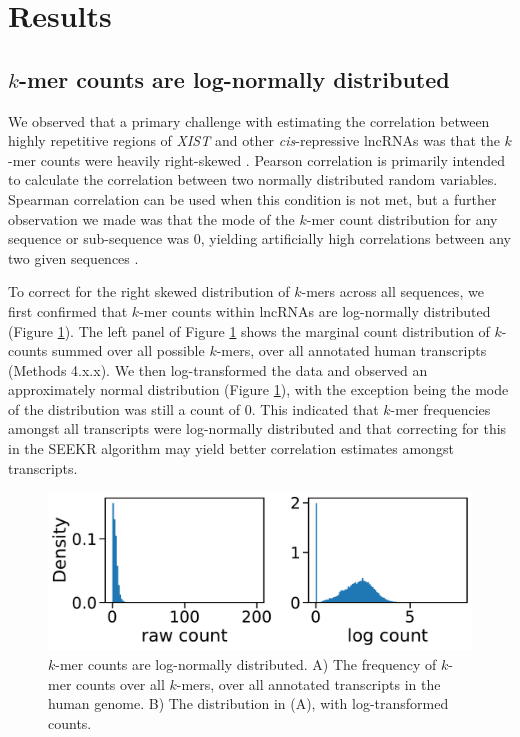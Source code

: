\section{Results} 

\subsection{$k$-mer counts are log-normally distributed}

We observed that a primary challenge with estimating the correlation between highly repetitive regions of \emph{XIST} and other \emph{cis}-repressive lncRNAs was that the $k$-mer counts were heavily right-skewed \cite{Sprague2019NonlinearDomains}. Pearson correlation is primarily intended to calculate the correlation between two normally distributed random variables. Spearman correlation can be used when this condition is not met, but a further observation we made was that the mode of the $k$-mer count distribution for any sequence or sub-sequence was 0, yielding artificially high correlations between any two given sequences \cite{Sprague2019NonlinearDomains}. 

To correct for the right skewed distribution of $k$-mers across all sequences, we first confirmed that $k$-mer counts within lncRNAs are log-normally distributed (Figure \ref{fig:logdist}). The left panel of Figure \ref{fig:logdist} shows the marginal count distribution of $k$-counts summed over all possible $k$-mers, over all annotated human transcripts (Methods 4.x.x). We then log-transformed the data and observed an approximately normal distribution (Figure \ref{fig:logdist}), with the exception being the mode of the distribution was still a count of 0. This indicated that $k$-mer frequencies amongst all transcripts were log-normally distributed and that correcting for this in the SEEKR algorithm may yield better correlation estimates amongst transcripts. 
\begin{figure}[h!]
\centering
\includegraphics[width=\textwidth]{images/kmers_log_dist.pdf}
\caption[$k$-mers are log-normally distributed within sequences]{$k$-mer counts are log-normally distributed. A) The frequency of $k$-mer counts over all $k$-mers, over all annotated transcripts in the human genome. B) The distribution in (A), with log-transformed counts.}
\label{fig:logdist}
\end{figure}

